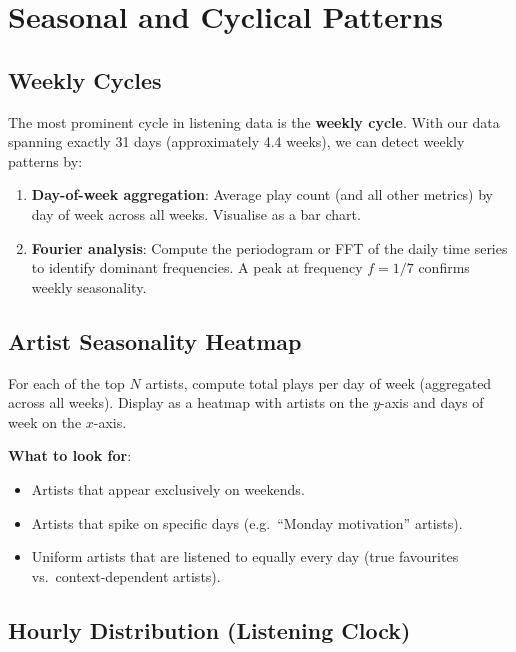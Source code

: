 \documentclass[12pt, a4paper]{article}
\begin{document}
\section{Seasonal and Cyclical Patterns}

\subsection{Weekly Cycles}

The most prominent cycle in listening data is the \textbf{weekly cycle}.
With our data spanning exactly 31 days (approximately 4.4 weeks), we can
detect weekly patterns by:

\begin{enumerate}
    \item \textbf{Day-of-week aggregation}: Average play count (and all
          other metrics) by day of week across all weeks. Visualise as a
          bar chart.
    \item \textbf{Fourier analysis}: Compute the periodogram or FFT of the
          daily time series to identify dominant frequencies. A peak at
          frequency $f = 1/7$ confirms weekly seasonality.
\end{enumerate}

\subsection{Artist Seasonality Heatmap}

For each of the top $N$ artists, compute total plays per day of week
(aggregated across all weeks). Display as a heatmap with artists on the
$y$-axis and days of week on the $x$-axis.

\textbf{What to look for}:
\begin{itemize}
    \item Artists that appear exclusively on weekends.
    \item Artists that spike on specific days (e.g.\ ``Monday motivation''
          artists).
    \item Uniform artists that are listened to equally every day (true
          favourites vs.\ context-dependent artists).
\end{itemize}

\subsection{Hourly Distribution (Listening Clock)}
\end{document}
